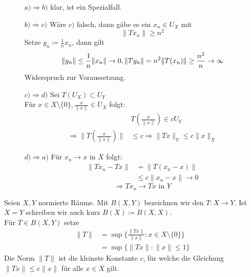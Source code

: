 \begin{beweis}
	\begin{description}
		\item[] $a) \Rightarrow b)$ klar, ist ein Spezialfall.
		\item[] $b) \Rightarrow c)$ Wäre $c)$ falsch, dann gäbe es ein $x_{n} \in U_{X}$ mit 
		\[ \| T x_{n} \| \geq n^{2} \]
		Setze $y_{n} \coloneqq \frac{1}{n} x_{n}$, dann gilt
		\[
			\| y_{n} \| \leq \frac{1}{n} \| x_{n} \| \rightarrow 0, \\
			\| T y_{n} \| = n^{2} \| T(x_{n}) \| \geq \frac{n^2}{n} \rightarrow \infty 
		 \]
		 Widerspruch zur Voraussetzung.
		 \item[] $c) \Rightarrow d)$ Sei $T(U_{X}) \subset U_{Y}$ \\
		 Für $x \in X \setminus \{0\}, \frac{x}{\| x \|} \in U_{X}$ folgt:
		 \begin{align*}
		 	&T \left( \frac{x}{\| x \|} \right) \in c U_{Y} \\
		 	\Rightarrow \| T \left( \frac{x}{\| x \|} \right) \| & \leq c
		 	\Rightarrow \| T x \|_{Y} \leq c \| x \|_{X}			
		 \end{align*}
		 \item[] $d) \Rightarrow a)$ Für $x_{n} \rightarrow x$ in $X$ folgt:
		 \begin{align*}
		 	\| T x_{n} - T x \| & = \| T ( x_{n} - x ) \| \\
		 						& \leq c \| x_{n} - x \| \rightarrow 0
		 \end{align*} \[ \Rightarrow T x_{n} \rightarrow T x \text{ in } Y \]
	\end{description}
\end{beweis}
	
	
\begin{definition}
	Seien $X, Y$ normierte Räume. Mit $B(X, Y)$ bezeichnen wir den  $T: X \rightarrow Y$. Ist $ X = Y$ schreiben wir auch kurz $B(X) \coloneqq B(X, X)$. \\
	
	Für $T \in B(X, Y)$ setze
	\begin{align*}
		\| T \| & = \sup \{ \frac{\| Tx \|}{\| x \|}: x \in X \setminus \{ 0 \} \} \\
				& = \sup \{ \| Tx \|: \| x \| \leq 1 \}
	\end{align*}
	Die Norm $\| T \|$ ist die kleinste Konstante $c$, für welche die Gleichung $\| Tx \| \leq c \| x \|$ für alle $x \in X$ gilt.
\end{definition}


